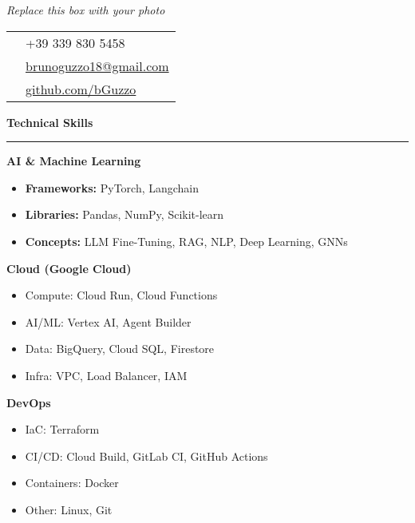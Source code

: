 \documentclass[9pt, a4paper]{article}
\newcommand{\cvsection}[1]{%
	\vspace{4pt}\par
	{\Large\bfseries\color{sectionblue}#1}\par
	\vspace{2pt}\hrule\vspace{6pt}
}
\begin{document}
	\begin{minipage}[t]{0.27\linewidth}
		\vspace{0pt} %
		
		\begin{center}
			\fbox{\rule{0pt}{4.5cm}\hspace{4.5cm}}\par
			\small\textit{Replace this box with your photo}
		\end{center}
		\vspace{8pt}
		
		\begin{tabularx}{\linewidth}{@{}lX@{}}
			\faPhone & +39 339 830 5458 \\
			\faEnvelope & \href{mailto:brunoguzzo18@gmail.com}{brunoguzzo18@gmail.com} \\
			\faGithub & \href{https://github.com/bGuzzo}{github.com/bGuzzo} \\
		\end{tabularx}
		
		\cvsection{Technical Skills}
		
		{\bfseries AI \& Machine Learning}
		\begin{itemize}[leftmargin=*, nosep, itemsep=2pt]
			\item \textbf{Frameworks:} PyTorch, Langchain
			\item \textbf{Libraries:} Pandas, NumPy, Scikit-learn
			\item \textbf{Concepts:} LLM Fine-Tuning, RAG, NLP, Deep Learning, GNNs
		\end{itemize}
		
		{\bfseries Cloud (Google Cloud)}
		\begin{itemize}[leftmargin=*, nosep, itemsep=2pt]
			\item Compute: Cloud Run, Cloud Functions
			\item AI/ML: Vertex AI, Agent Builder
			\item Data: BigQuery, Cloud SQL, Firestore
			\item Infra: VPC, Load Balancer, IAM
		\end{itemize}
		
		{\bfseries DevOps}
		\begin{itemize}[leftmargin=*, nosep, itemsep=2pt]
			\item IaC: Terraform
			\item CI/CD: Cloud Build, GitLab CI, GitHub Actions
			\item Containers: Docker
			\item Other: Linux, Git
		\end{itemize}
		

\end{minipage}
\end{document}
